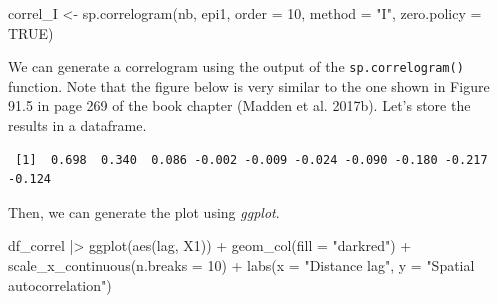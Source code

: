 \documentclass[
  letterpaper,
  DIV=11,
  numbers=noendperiod]{scrreprt}
\newenvironment{Shaded}{\begin{snugshade}}{\end{snugshade}}
\newcommand{\AttributeTok}[1]{\textcolor[rgb]{0.40,0.45,0.13}{#1}}
\newcommand{\CommentTok}[1]{\textcolor[rgb]{0.37,0.37,0.37}{#1}}
\newcommand{\ConstantTok}[1]{\textcolor[rgb]{0.56,0.35,0.01}{#1}}
\newcommand{\DecValTok}[1]{\textcolor[rgb]{0.68,0.00,0.00}{#1}}
\newcommand{\FunctionTok}[1]{\textcolor[rgb]{0.28,0.35,0.67}{#1}}
\newcommand{\NormalTok}[1]{\textcolor[rgb]{0.00,0.23,0.31}{#1}}
\newcommand{\OtherTok}[1]{\textcolor[rgb]{0.00,0.23,0.31}{#1}}
\newcommand{\SpecialCharTok}[1]{\textcolor[rgb]{0.37,0.37,0.37}{#1}}
\newcommand{\StringTok}[1]{\textcolor[rgb]{0.13,0.47,0.30}{#1}}
\begin{document}
\begin{Shaded}
\begin{Highlighting}[]
\NormalTok{correl\_I }\OtherTok{\textless{}{-}} \FunctionTok{sp.correlogram}\NormalTok{(nb, epi1, }
                           \AttributeTok{order =} \DecValTok{10}\NormalTok{,}
                           \AttributeTok{method =} \StringTok{"I"}\NormalTok{,  }
                           \AttributeTok{zero.policy =} \ConstantTok{TRUE}\NormalTok{)}
\end{Highlighting}
\end{Shaded}

We can generate a correlogram using the output of the
\texttt{sp.correlogram()} function. Note that the figure below is very
similar to the one shown in Figure 91.5 in page 269 of the book chapter
(Madden et al. 2017b). Let's store the results in a dataframe.

\begin{Shaded}
\end{Shaded}

\begin{verbatim}
 [1]  0.698  0.340  0.086 -0.002 -0.009 -0.024 -0.090 -0.180 -0.217 -0.124
\end{verbatim}

Then, we can generate the plot using \emph{ggplot}.

\begin{Shaded}
\begin{Highlighting}[]
\NormalTok{df\_correl }\SpecialCharTok{|\textgreater{}}
  \FunctionTok{ggplot}\NormalTok{(}\FunctionTok{aes}\NormalTok{(lag, X1)) }\SpecialCharTok{+}
  \FunctionTok{geom\_col}\NormalTok{(}\AttributeTok{fill =} \StringTok{"darkred"}\NormalTok{) }\SpecialCharTok{+}
  \FunctionTok{scale\_x\_continuous}\NormalTok{(}\AttributeTok{n.breaks =} \DecValTok{10}\NormalTok{) }\SpecialCharTok{+}
  \FunctionTok{labs}\NormalTok{(}\AttributeTok{x =} \StringTok{"Distance lag"}\NormalTok{, }\AttributeTok{y =} \StringTok{"Spatial autocorrelation"}\NormalTok{)}
\end{Highlighting}
\end{Shaded}
\end{document}
